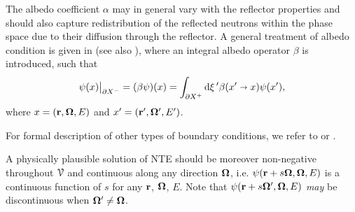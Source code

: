 \begin{remark}
	The albedo coefficient $\alpha$ may in general vary with the reflector properties and should also capture 
	redistribution of the reflected neutrons within the phase space due to their diffusion through the reflector. A general
	treatment of albedo condition is given in \cite{Sanchez4} (see also \cite{Sanchez3}), where an integral albedo operator
	$\beta$ is introduced, such that
\begin{equation}\label{eq:albedo-general}
	\angflux(x)\big\vert_{\pX[-]} = (\beta\angflux)(x) = \bndint[']{\pX[+]}\beta(x'\sra x)\angflux(x'),
\end{equation}
	where $x = (\br,\bomega,E)$ and $x' = (\br',\bomega',E')$. 
\end{remark}
For formal description of other types of boundary conditions, we refer to \cite{Sanchez4} or \cite[Sec. 1.3]{Agoshkov}.

A physically plausible solution of NTE should be moreover non-negative throughout $\VV$ and continuous along any
direction $\bomega$, i.e. $\psi(\br + s\bomega,\bomega,E)$ is a continuous function of $s$ for any $\br$, $\bomega$, $E$. Note
that $\psi(\br + s\bomega',\bomega,E)$ \textsl{may} be discontinuous when $\bomega' \neq \bomega$.

